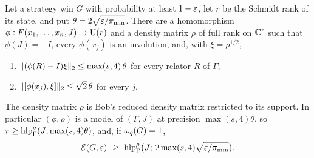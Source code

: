 \begin{theorem}[Transfer]\label{thm:transfer}
Let a strategy win $G$ with probability at least $1-\varepsilon$, let $r$ be the Schmidt rank of its state, and put
$\theta=2\sqrt{\varepsilon/\pi_{\min}}$. There are a homomorphism $\phi:F(x_1,\dots,x_n,J)\to\mathrm U(r)$ and a density matrix $\rho$ of full rank on
$\mathbb C^r$ such that $\phi(J)=-I$, every $\phi(x_j)$ is an involution, and, with $\xi=\rho^{1/2}$,
\begin{enumerate}[label=(\alph*),itemsep=1pt]
\item $\lVert (\phi(R)-I)\xi\rVert_2\le\max(s,4)\,\theta$ for every relator $R$ of $\Gamma$;
\item $\lVert [\phi(x_j),\xi]\rVert_2\le\sqrt2\,\theta$ for every $j$.
\end{enumerate}
The density matrix $\rho$ is Bob's reduced density matrix restricted to its support. In particular $(\phi,\rho)$ is a model of $(\Gamma,J)$
at precision $\max(s,4)\theta$, so $r\ge\operatorname{hlp}^{\rho}_\Gamma(J;\max(s,4)\theta)$, and, if $\omega_{q}(G)=1$,
\[
\Ent(G,\eps)\ \ge\ \hlps_\Gamma\bigl(J;\,2\max(s,4)\sqrt{\eps/\pi_{\min}}\bigr).
\]
\end{theorem}


